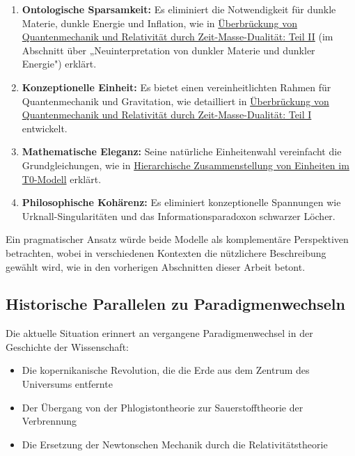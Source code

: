 \documentclass[12pt,a4paper]{article}
\begin{document}
	\begin{enumerate}
		\item \textbf{Ontologische Sparsamkeit:} Es eliminiert die Notwendigkeit für dunkle Materie, dunkle Energie und Inflation, wie in \href{https://github.com/jpascher/T0-Time-Mass-Duality/tree/main/2/pdf/English/QMRelTimeMassPart2En.pdf}{Überbrückung von Quantenmechanik und Relativität durch Zeit-Masse-Dualität: Teil II} (im Abschnitt über „Neuinterpretation von dunkler Materie und dunkler Energie") erklärt.
		
		\item \textbf{Konzeptionelle Einheit:} Es bietet einen vereinheitlichten Rahmen für Quantenmechanik und Gravitation, wie detailliert in \href{https://github.com/jpascher/T0-Time-Mass-Duality/tree/main/2/pdf/English/QMRelTimeMassPart1En.pdf}{Überbrückung von Quantenmechanik und Relativität durch Zeit-Masse-Dualität: Teil I} entwickelt.
		
		\item \textbf{Mathematische Eleganz:} Seine natürliche Einheitenwahl vereinfacht die Grundgleichungen, wie in \href{https://github.com/jpascher/T0-Time-Mass-Duality/tree/main/2/pdf/English/NatEinheitenSystematikEn.pdf}{Hierarchische Zusammenstellung von Einheiten im T0-Modell} erklärt.
		
		\item \textbf{Philosophische Kohärenz:} Es eliminiert konzeptionelle Spannungen wie Urknall-Singularitäten und das Informationsparadoxon schwarzer Löcher.
	\end{enumerate}
	
	Ein pragmatischer Ansatz würde beide Modelle als komplementäre Perspektiven betrachten, wobei in verschiedenen Kontexten die nützlichere Beschreibung gewählt wird, wie in den vorherigen Abschnitten dieser Arbeit betont.
	
	\subsection{Historische Parallelen zu Paradigmenwechseln}
	\label{subsec:historical_parallels}
	
	Die aktuelle Situation erinnert an vergangene Paradigmenwechsel in der Geschichte der Wissenschaft:
	
	\begin{itemize}
		\item Die kopernikanische Revolution, die die Erde aus dem Zentrum des Universums entfernte
		\item Der Übergang von der Phlogistontheorie zur Sauerstofftheorie der Verbrennung
		\item Die Ersetzung der Newtonschen Mechanik durch die Relativitätstheorie
	\end{itemize}
	
\end{document}

